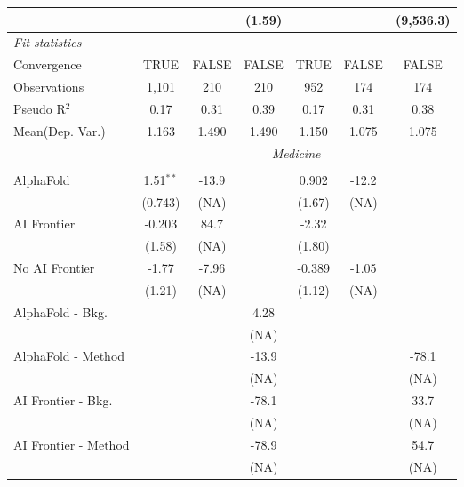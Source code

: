 \begin{tabular}{lcccccc}
                           &              &               & (1.59)        &              &        & (9,536.3)\\   
   \midrule
   \emph{Fit statistics}\\
   Convergence             &TRUE          & FALSE         & FALSE         & TRUE         & FALSE  & FALSE\\  
   Observations            & 1,101        & 210           & 210           & 952          & 174    & 174\\  
   Pseudo R$^2$            & 0.17         & 0.31          & 0.39          & 0.17         & 0.31   & 0.38\\  
   
Mean(Dep. Var.) & 1.163 & 1.490 & 1.490 & 1.150 & 1.075 & 1.075 \\
 & \multicolumn{6}{c}{\textit{Medicine}} \\ \\
   AlphaFold               & 1.51$^{**}$ & -13.9 &       & 0.902  & -12.2 &   \\   
                           & (0.743)     & (NA)  &       & (1.67) & (NA)  &   \\   
   AI Frontier             & -0.203      & 84.7  &       & -2.32  &       &   \\   
                           & (1.58)      & (NA)  &       & (1.80) &       &   \\   
   No AI Frontier          & -1.77       & -7.96 &       & -0.389 & -1.05 &   \\   
                           & (1.21)      & (NA)  &       & (1.12) & (NA)  &   \\   
   AlphaFold - Bkg.        &             &       & 4.28  &        &       &   \\   
                           &             &       & (NA)  &        &       &   \\   
   AlphaFold - Method      &             &       & -13.9 &        &       & -78.1\\   
                           &             &       & (NA)  &        &       & (NA)\\   
   AI Frontier - Bkg.      &             &       & -78.1 &        &       & 33.7\\   
                           &             &       & (NA)  &        &       & (NA)\\   
   AI Frontier - Method    &             &       & -78.9 &        &       & 54.7\\   
                           &             &       & (NA)  &        &       & (NA)\\   

\end{tabular}
